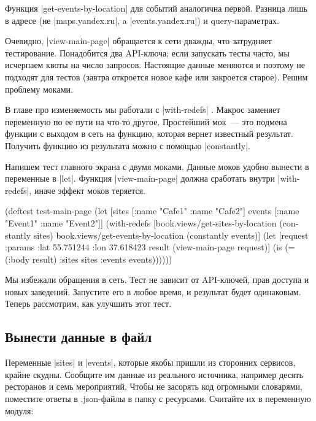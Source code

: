 Функция \spverb|get-events-by-location| для событий аналогична первой. Разница
лишь в адресе (не \spverb|maps.yandex.ru|, a \spverb|events.yandex.ru|) и
query-параметрах.

Очевидно, \spverb|view-main-page| обращается к сети дважды, что затрудняет
тестирование. Понадобится два API-ключа; если запускать тесты часто, мы
исчерпаем квоты на число запросов. Настоящие данные меняются и поэтому не
подходят для тестов (завтра откроется новое кафе или закроется старое). Решим
проблему моками.

В главе про изменяемость мы работали с \spverb|with-redefs| .
Макрос заменяет переменную по ее пути на что-то другое. Простейший мок~---
это подмена функции с выходом в сеть на функцию, которая вернет известный результат.
Получить функцию из результата можно с помощью \spverb|constantly|.

Напишем тест главного экрана с двумя моками. Данные моков удобно вынести в
переменные в \spverb|let|. Функция \spverb|view-main-page| должна сработать
внутри \spverb|with-redefs|, иначе эффект моков теряется.

\begin{english}
  \begin{clojure}
(deftest test-main-page
  (let [sites [{:name "Cafe1"} {:name "Cafe2"}]
        events [{:name "Event1"} {:name "Event2"}]]
    (with-redefs
      [book.views/get-sites-by-location (constantly sites)
       book.views/get-events-by-location (constantly events)]
      (let [request {:params {:lat 55.751244
                              :lon 37.618423}}
            result (view-main-page request)]
        (is (= (:body result)
               {:sites sites :events events}))))))
  \end{clojure}
\end{english}

Мы избежали обращения в сеть. Тест не зависит от API-ключей, прав доступа и
новых заведений. Запустите его в любое время, и результат будет
одинаковым. Теперь рассмотрим, как улучшить этот тест.

\subsection{Вынести данные в файл}

Переменные \spverb|sites| и \spverb|events|, которые якобы пришли из сторонних
сервисов, крайне скудны. Сообщите им данные из реального источника, например
десять ресторанов и семь мероприятий. Чтобы не засорять код огромными словарями,
поместите ответы в .json-файлы в папку с ресурсами. Считайте их в переменную
модуля:

